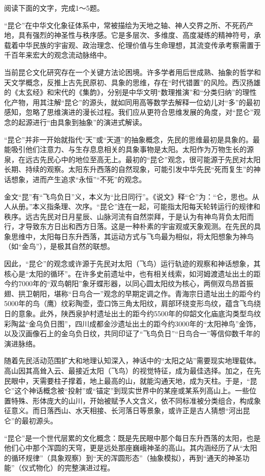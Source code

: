 \documentclass[11pt,a4paper]{ctexart}
\begin{document}


阅读下面的文字，完成1～5题。

\begin{materialtext}
“昆仑”在中华文化象征体系中，常被描绘为天地之轴、神人交界之所、不死药产地，具有强烈的神圣性与秩序感。它是多层次、多维度、高度凝练的精神符号，承载着中华民族的宇宙观、政治理念、伦理价值与生命理想，其流变传承考察需置于千百年来宏大的观念流动脉络中。

当前昆仑文化研究存在一个关键方法论困境。许多学者用后世成熟、抽象的哲学和天文学概念，反推上古先民原初、具象的思维，存在“时代错置”的风险。西汉扬雄的《太玄经》和宋代的《集韵》，分别是中华文明“数理推演”和“分类归纳”的理性化产物，用其注解“昆仑”的源头，就如同用高等数学去解释一位幼儿对“多”的最初感知，忽略了思维演进的漫长过程。我们应从更符合思维发展的角度，对“昆仑”观念的起源进行“由具象到抽象”的演进式解读。

“昆仑”并非一开始就指代“天”或“天道”的抽象概念，先民的思维最初是具象的。最能吸引他们注意力、与生存息息相关的具象事物是太阳。太阳作为万物生长的源泉，在远古先民心中的地位至高无上。最初的“昆仑”观念，很可能源于先民对太阳长期、持续的观察。太阳东升西落的自然现象，可能引发中华先民“死而复生”的神话想象，进而产生追求“永恒”“不死”的观念。

金文“昆”有“飞鸟负日”义，本义为“比日同行”。《说文》释“仑”为：“仑，思也。从人从册。”本义指条理、次序。“昆仑”连在一起，可能指太阳每天轮转运行的规律和秩序。远古先民对日月星辰、山脉河流有自然崇拜，于是认为有神鸟背负太阳而行，才导致东方日出和西方日落。这是一种朴素的宇宙观或天象观测。在先民的具象思维中，太阳每日东升西落，其运动方式与飞鸟最为相似，将太阳想象为神鸟（如“金鸟”），是极其自然的联想。

因此，“昆仑”的观念或许源于先民对太阳（飞鸟）运行轨迹的观察和神话想象，其核心是“太阳的循环”。在许多史前遗址中，也有相关线索，如河姆渡遗址出土的距今约7000年的“双鸟朝阳”象牙蝶形器，以同心圆太阳纹为核心，两侧双鸟昂首振翅、拱卫朝阳，堪称“日鸟合一”观念的早期定调之作。青海宗日遗址出土的距今约5000年的鸟（鹰）纹彩陶壶，壶口饰三角太阳纹，肩部环绕变形鸟纹，蕴含飞鸟绕日的意象。此外，陕西泉护村遗址出土的距今约5500年的仰韶文化庙底沟类型鸟纹彩陶盆“金乌负日图”，四川成都金沙遗址出土的距今约3000年的“太阳神鸟”金饰，以及汉画像石上的金乌负日纹，共同印证了“飞鸟负日”“日鸟合一”等信仰数千年的演进脉络。

随着先民活动范围扩大和地理认知深入，神话中的“太阳之站”需要现实地理载体。高山因其高耸入云、最接近太阳（飞鸟）的视觉特征，成为最佳选择。加之，在先民眼中，天需要柱子撑着，地上最高的山，就能沟通天地，成为天柱。于是，“昆仑”这个神话概念被“投射”或“锚定”到现实世界中的某座或某系列高山上。一些位置特殊、形体庞大的山川，开始被赋予人文含义，依不同标准被分类组合，构成象征意义。而日落西山、水天相接、长河落日等景象，或许正是古人猜想“河出昆仑”的最初源头。

“昆仑”是一个世代层累的文化概念：既是先民眼中那个每日东升西落的太阳，也是他们心中那个浑圆的天穹，更是远处那座巍峨神圣的高山。其内涵经历了从“太阳的循环规律”（具象观察）到“天的浑圆形态”（抽象模拟），再到“通天的神圣功能”（仪式物化）的完整演进过程。
\end{materialtext}
\end{document}
